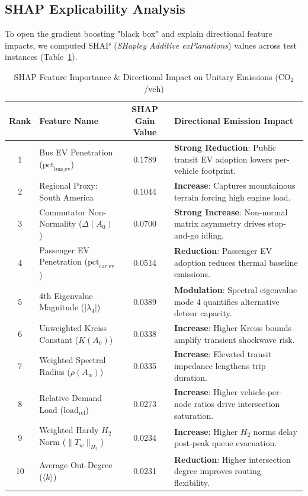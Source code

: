 \documentclass[lettersize,journal]{IEEEtran}
\begin{document}
\subsection{SHAP Explicability Analysis}
To open the gradient boosting "black box" and explain directional feature impacts, we computed SHAP (\emph{SHapley Additive exPlanations}) values across test instances (Table~\ref{tab:shap}).

\begin{table}[htbp]
\caption{SHAP Feature Importance \& Directional Impact on Unitary Emissions ($\text{CO}_2$/veh)}
\label{tab:shap}
\centering
\begin{tabular}{clcl}
\toprule
Rank & Feature Name & SHAP Gain Value & Directional Emission Impact \\
\midrule
1 & Bus EV Penetration ($\text{pct}_{\text{bus\_ev}}$) & 0.1789 & \textbf{Strong Reduction}: Public transit EV adoption lowers per-vehicle footprint. \\
2 & Regional Proxy: South America & 0.1044 & \textbf{Increase}: Captures mountainous terrain forcing high engine load. \\
3 & Commutator Non-Normality ($\Delta(A_0)$) & 0.0700 & \textbf{Strong Increase}: Non-normal matrix asymmetry drives stop-and-go idling. \\
4 & Passenger EV Penetration ($\text{pct}_{\text{car\_ev}}$) & 0.0514 & \textbf{Reduction}: Passenger EV adoption reduces thermal baseline emissions. \\
5 & 4th Eigenvalue Magnitude ($|\lambda_4|$) & 0.0389 & \textbf{Modulation}: Spectral eigenvalue mode 4 quantifies alternative detour capacity. \\
6 & Unweighted Kreiss Constant ($K(A_0)$) & 0.0338 & \textbf{Increase}: Higher Kreiss bounds amplify transient shockwave risk. \\
7 & Weighted Spectral Radius ($\rho(A_w)$) & 0.0335 & \textbf{Increase}: Elevated transit impedance lengthens trip duration. \\
8 & Relative Demand Load ($\text{load}_{\text{rel}}$) & 0.0273 & \textbf{Increase}: Higher vehicle-per-node ratios drive intersection saturation. \\
9 & Weighted Hardy $H_2$ Norm ($\|T_w\|_{H_2}$) & 0.0234 & \textbf{Increase}: Higher $H_2$ norms delay post-peak queue evacuation. \\
10 & Average Out-Degree ($\langle k \rangle$) & 0.0231 & \textbf{Reduction}: Higher intersection degree improves routing flexibility. \\
\bottomrule
\end{tabular}
\end{table}
\end{document}
